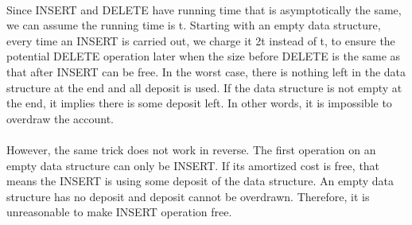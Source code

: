 \begin{problem}{4} ~\\
Since INSERT and DELETE have running time that is asymptotically the same, we can assume the running time is t. Starting with an empty data structure, every time an INSERT is carried out, we charge it 2t instead of t, to ensure the potential DELETE operation later when the size before DELETE is the same as that after INSERT can be free. In the worst case, there is nothing left in the data structure at the end and all deposit is used. If the data structure is not empty at the end, it implies there is some deposit left. In other words, it is impossible to overdraw the account.\\
\\
However, the same trick does not work in reverse. The first operation on an empty data structure can only be INSERT. If its amortized cost is free, that means the INSERT is using some deposit of the data structure. An empty data structure has no deposit and deposit cannot be overdrawn. Therefore, it is unreasonable to make INSERT operation free.
\end{problem}